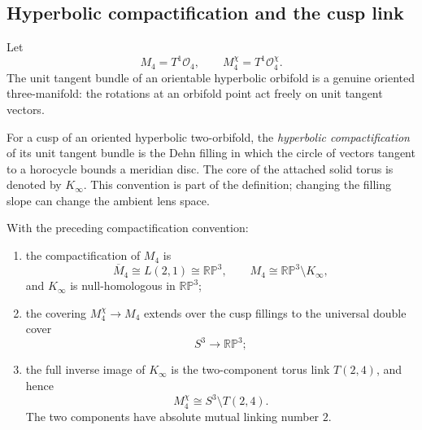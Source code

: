 \subsection{Hyperbolic compactification and the cusp link}

Let
\[
 M_4=T^1\mathcal O_4,
 \qquad
 M_4^\chi=T^1\mathcal O_4^\chi.
\]
The unit tangent bundle of an orientable hyperbolic orbifold is a genuine
oriented three-manifold: the rotations at an orbifold point act freely on unit
tangent vectors.

\begin{definition}
For a cusp of an oriented hyperbolic two-orbifold, the \emph{hyperbolic
compactification} of its unit tangent bundle is the Dehn filling in which the
circle of vectors tangent to a horocycle bounds a meridian disc.  The core of
the attached solid torus is denoted by \(K_\infty\).  This convention is part of
the definition; changing the filling slope can change the ambient lens space.
\end{definition}

\begin{theorem}[The \(q=4\) cusp knot and its sign-cover link]
\label{thm:q4-sign-cover-torus-link}
With the preceding compactification convention:
\begin{enumerate}
\item the compactification of \(M_4\) is
\begin{equation}
 \overline M_4\cong L(2,1)\cong\mathbb {RP}^3,
 \qquad
 M_4\cong\mathbb {RP}^3\setminus K_\infty,
 \label{eq:q4-rp3-cusp-complement}
\end{equation}
and \(K_\infty\) is null-homologous in \(\mathbb {RP}^3\);
\item the covering \(M_4^\chi\to M_4\) extends over the cusp fillings to the
universal double cover
\[
 S^3\longrightarrow\mathbb {RP}^3;
\]
\item the full inverse image of \(K_\infty\) is the two-component torus link
\(T(2,4)\), and hence
\begin{equation}
 M_4^\chi\cong S^3\setminus T(2,4).
 \label{eq:q4-sign-cover-link-complement}
\end{equation}
The two components have absolute mutual linking number \(2\).
\end{enumerate}
\end{theorem}

